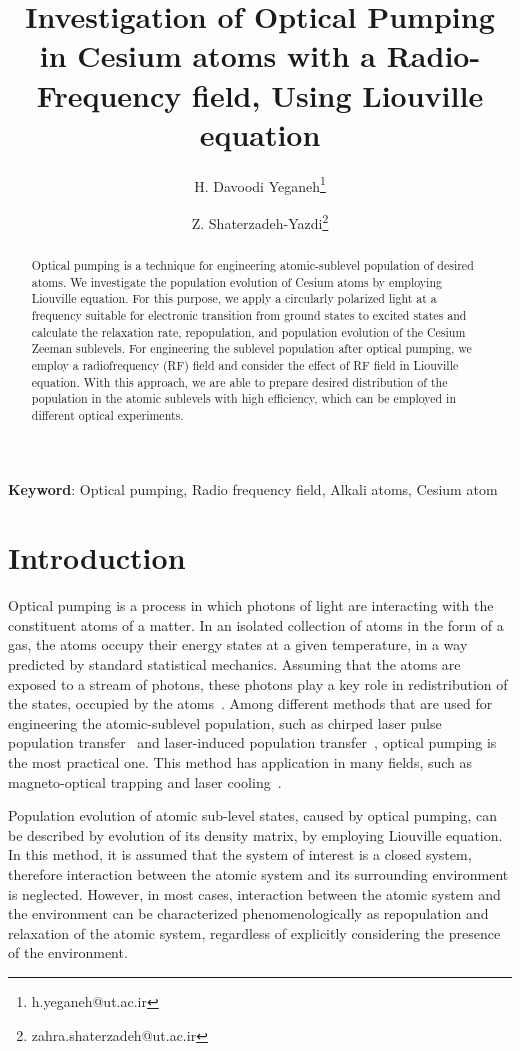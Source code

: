 \documentclass[a4paper]{article}
\date{}
\title{\bf Investigation of Optical Pumping in Cesium
atoms with a Radio-Frequency field, Using Liouville equation}
\author[1]{H. Davoodi Yeganeh\thanks{h.yeganeh@ut.ac.ir }}
\author[1]{Z. Shaterzadeh-Yazdi\thanks{zahra.shaterzadeh@ut.ac.ir }}
\affil[1]{School of Engineering Science, College of Engineering, University of Tehran, Tehran, Iran, 143-9955961}
\begin{document}
\maketitle

\begin{abstract}
Optical pumping is a technique for engineering atomic-sublevel population of desired atoms. We investigate the population evolution of Cesium atoms by employing Liouville equation. For this purpose, we apply a circularly polarized light at a frequency suitable for electronic transition from ground states to excited states and calculate the relaxation rate, repopulation, and population evolution of the
Cesium Zeeman sublevels. For engineering the sublevel population after optical pumping, we employ a radiofrequency (RF) field and consider the effect of RF field in Liouville equation. With this approach, we are able to prepare desired distribution of the population in the atomic sublevels with high efficiency, which can be employed in different optical experiments.
\end{abstract}
{\bf Keyword}: Optical pumping, Radio frequency field, Alkali atoms, Cesium atom

\section{Introduction}
Optical pumping is a process in which photons of light are interacting with the constituent atoms of a matter. In an isolated collection of atoms in the form of a gas, the atoms occupy their energy states at a given temperature, in a way predicted by standard statistical mechanics. Assuming that the atoms are exposed to a stream of photons, these photons play a key role in redistribution of the states, occupied by the atoms~\cite{r1,r2}. Among different methods that are used for engineering the atomic-sublevel population, such as chirped laser pulse population transfer~\cite{r3} and laser-induced population transfer~\cite{r4}, optical pumping is the most practical one. This method has application in many fields, such as  magneto-optical trapping and laser cooling~\cite{r5}. 

Population evolution of atomic sub-level states, caused by optical pumping, can be described by evolution of its density matrix, by employing Liouville equation. In this method, it is assumed that the system of interest is a closed system, therefore interaction between the atomic system and its surrounding environment is neglected. However, in most cases, interaction between the atomic system and the environment can be characterized phenomenologically as repopulation and relaxation of the atomic system, regardless of explicitly considering the presence of the environment. 
\end{document}
